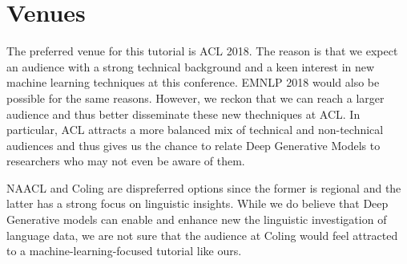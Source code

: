 \section{Venues}

The preferred venue for this tutorial is ACL 2018. The reason is that we expect an audience with
a strong technical background and a keen interest in new machine learning techniques at this conference.
EMNLP 2018 would also be possible for the same reasons. However, we reckon that we can reach a larger
audience and thus better disseminate these new thechniques at ACL. In particular, ACL attracts 
a more balanced mix of technical and non-technical audiences and thus gives us the chance to relate
Deep Generative Models to researchers who may not even be aware of them.

NAACL and Coling are dispreferred options since the former is regional and the latter has a strong
focus on linguistic insights. While we do believe that Deep Generative models can enable and
enhance new the linguistic investigation of language data, we are not sure that the audience at 
Coling would feel attracted to a machine-learning-focused tutorial like ours. 